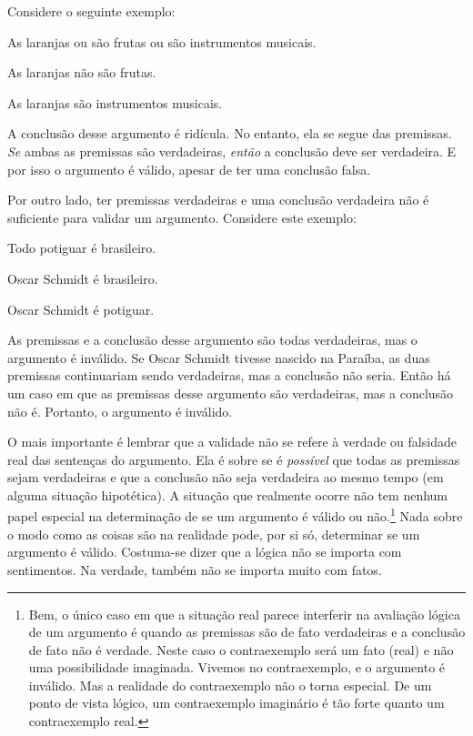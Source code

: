 Considere o seguinte exemplo:
	\begin{earg}
		\item[] As laranjas ou são frutas ou são instrumentos musicais.
		\item[] As laranjas não são frutas.
		\item[\therefore] As laranjas são instrumentos musicais.
	\end{earg}
A conclusão desse argumento é ridícula. No entanto, ela se segue das premissas. \emph{Se} ambas as premissas são verdadeiras, \emph{então} a conclusão deve ser verdadeira. E por isso o argumento é válido, apesar de ter uma conclusão falsa.

Por outro lado, ter premissas verdadeiras e uma conclusão verdadeira não é suficiente para validar um argumento. Considere este exemplo:
	\begin{earg}
		\item[] Todo potiguar é brasileiro.
		\item[] Oscar Schmidt é brasileiro.
		\item[\therefore] Oscar Schmidt é potiguar.
	\end{earg}
As premissas e a conclusão desse argumento são todas verdadeiras, mas o argumento é inválido.
Se Oscar Schmidt tivesse nascido na Paraíba, as duas premissas continuariam sendo verdadeiras, mas a conclusão não seria.
Então há um caso em que as premissas desse argumento são verdadeiras, mas a conclusão não é.
Portanto, o argumento é inválido.

O mais importante é lembrar que a validade não se refere à verdade ou falsidade real das sentenças do argumento.
Ela é sobre se é \emph{possível} que todas as premissas sejam verdadeiras e que a conclusão não seja verdadeira ao mesmo tempo (em alguma situação hipotética).
A situação que realmente ocorre não tem nenhum papel especial na determinação de se um argumento é válido ou não.\footnote{Bem, o único caso em que a situação real parece interferir na avaliação lógica de um argumento é quando as premissas são de fato verdadeiras e a conclusão de fato não é verdade.
Neste caso o contraexemplo será um fato (real) e não uma possibilidade imaginada.
Vivemos no contraexemplo, e o argumento é inválido.
Mas a realidade do contraexemplo não o torna especial.
De um ponto de vista lógico, um contraexemplo imaginário é tão forte quanto um contraexemplo real.}
Nada sobre o modo como as coisas são na realidade pode, por si só, determinar se um argumento é válido.
Costuma-se dizer que a lógica não se importa com sentimentos.
Na verdade, também não se importa muito com fatos.

